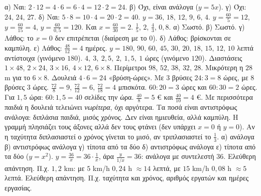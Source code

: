  α) Ναι: $2\cdot12=4\cdot6=6\cdot4=12\cdot2=24$. β) Όχι, είναι ανάλογα ($y=5x$). γ) Όχι: $24,\,24,\,27$. δ) Ναι: $5\cdot8=10\cdot4=20\cdot2=40$.
 $y=36,\,18,\,12,\,9,\,6,\,4$.
 $y=\frac{60}{5}=12$, $y=\frac{60}{15}=4$, $y=\frac{60}{0{,}5}=120$. Και $x=\frac{60}{30}=2$.
 $\frac{1}{5}$, $2$, $\frac{4}{3}$, $0{,}8$.
 α) Σωστό. β) Σωστό. γ) Λάθος: το $x=0$ δεν επιτρέπεται (διαίρεση με το $0$). δ) Λάθος: βρίσκονται σε καμπύλη. ε) Λάθος: $\frac{48}{12}=4$ ημέρες.
 $y=180,\,90,\,60,\,45,\,30,\,20,\,18,\,15,\,12,\,10$ λεπτά αντίστοιχα (γινόμενο $180$).
 $4,\ 3,\ 2{,}5,\ 2,\ 1{,}5,\ 1$ ώρες (γινόμενο $120$).
 Διαστάσεις $1\times48$, $2\times24$, $3\times16$, $4\times12$, $6\times8$. Περίμετροι $98$, $52$, $38$, $32$, $28$. Μικρότερη η $28$ m για το $6\times8$.
 Δουλειά $4\cdot6=24$ «βρύση-ώρες». Με $3$ βρύσες $24:3=8$ ώρες, με $8$ βρύσες $3$ ώρες.
 $\frac{72}{8}=9$, $\frac{72}{12}=6$, $\frac{72}{18}=4$ μπισκότα.
 $60:20=3$ ώρες και $60:30=2$ ώρες. Για $1{,}5$ ώρα: $60:1{,}5=40$ σελίδες την ώρα.
 $\frac{40}{8}=5$ € και $\frac{40}{10}=4$ €.
 Με περισσότερα παιδιά η δουλειά τελειώνει \emph{νωρίτερα}, όχι αργότερα. Τα ποσά είναι αντιστρόφως ανάλογα: διπλάσια παιδιά, μισός χρόνος.
 Δεν είναι ημιευθεία, αλλά καμπύλη. Η γραμμή πλησιάζει τους άξονες αλλά δεν τους φτάνει (δεν υπάρχει $x=0$ ή $y=0$).
 Αν η ταχύτητα διπλασιαστεί ο χρόνος γίνεται το μισό, αν τριπλασιαστεί το $\frac{1}{3}$.
 α) ανάλογα \quad β) αντιστρόφως ανάλογα \quad γ) τίποτα από τα δύο \quad δ) αντιστρόφως ανάλογα \quad ε) τίποτα από τα δύο ($y=x^2$).
 $y=\frac{36}{x}=36\cdot\frac{1}{x}$, άρα $\frac{y}{1/x}=36$: ανάλογα με συντελεστή $36$.
 Ελεύθερη απάντηση. Π.χ. $1{,}2$ km: με $5$ km/h $0{,}24$ h $\approx14$ λεπτά, με $15$ km/h $0{,}08$ h $\approx5$ λεπτά.
 Ελεύθερη απάντηση. Π.χ. ταχύτητα και χρόνος, αριθμός εργατών και ημέρες εργασίας.
